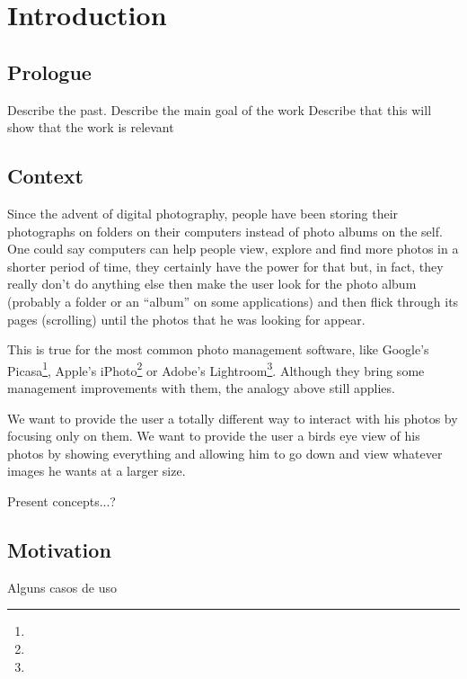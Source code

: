 \chapter{Introduction} %
\label{chapter:introduction}


\section{Prologue} %
\label{sec:prologue}

Describe the past.
Describe the main goal of the work
Describe that this will show that the work is relevant



\section{Context} %
\label{sec:context}

Since the advent of digital photography, people have been storing their photographs on folders on their computers instead of photo albums on the self. One could say computers can help people view, explore and find more photos in a shorter period of time, they certainly have the power for that but, in fact, they really don't do anything else then make the user look for the photo album (probably a folder or an ``album'' on some applications) and then flick through its pages (scrolling) until the photos that he was looking for appear.

This is true for the most common photo management software, like Google's Picasa\footnote{}, Apple's iPhoto\footnote{} or Adobe's Lightroom\footnote{}. Although they bring some management improvements with them, the analogy above still applies.

We want to provide the user a totally different way to interact with his photos by focusing only on them. We want to provide the user a birds eye view of his photos by showing everything and allowing him to go down and view whatever images he wants at a larger size.


Present concepts...?


\section{Motivation} %
\label{sec:motivation}

Alguns casos de uso
